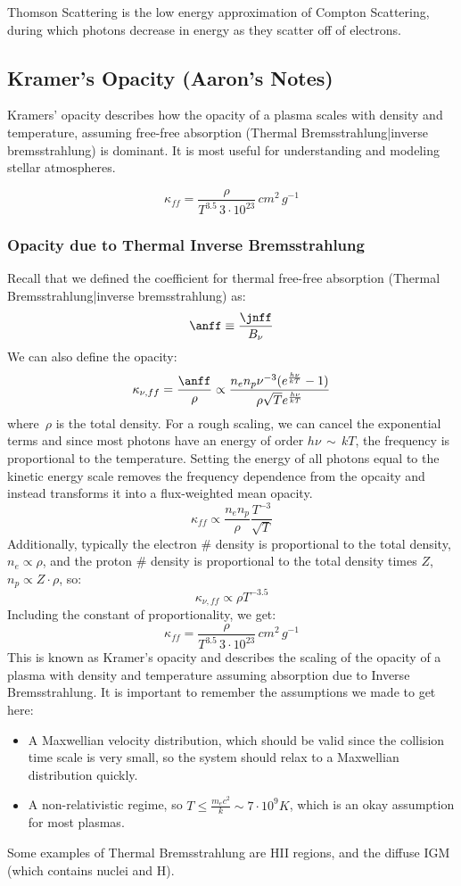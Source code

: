 \documentclass{article}
\begin{document}
Thomson Scattering is the low energy approximation of Compton Scattering, during which photons decrease in energy as they scatter off of electrons.


\subsection{Kramer's Opacity (Aaron's Notes)}

Kramers' opacity describes how the opacity of a plasma scales with density and temperature, assuming free-free absorption (Thermal Bremsstrahlung|inverse bremsstrahlung) is dominant. It is most useful for understanding and modeling stellar atmospheres.

$$\kappa_{ff} =\frac{\rho }{ T^{3.5}\,3\cdot10^{23}}\,cm^2\, g^{-1}$$

\subsubsection{Opacity due to Thermal Inverse Bremsstrahlung}

Recall that we defined the coefficient for thermal free-free absorption (Thermal Bremsstrahlung|inverse bremsstrahlung) as:
\def\knff{\kappa_{\nu,ff}}
$$\anff\equiv\frac{\jnff}{ B_{\nu}}$$
We can also define the opacity:
$$\knff=\frac{\anff}{\rho}\propto\frac{n_en_p\nu^{-3}(e^\frac{h\nu}{ kT}-1)}{
\rho\sqrt{T}e^\frac{h\nu}{ kT}}$$
where $\,\rho$ is the total density.  For a rough scaling, we can cancel the exponential terms and since most photons have an energy of order $h\nu\,\sim\, kT$, the frequency is proportional to the temperature. Setting the energy of all photons equal to the kinetic energy scale removes the frequency dependence from the opcaity and instead transforms it into a flux-weighted mean opacity.
$$\kappa_{ff}\propto\frac{n_en_p}{\rho}\frac{T^{-3}}{\sqrt{T}}$$
Additionally, typically the electron \# density is proportional to the total density, $n_e\propto\rho$, and the proton \# density is proportional to the total density times $Z$, $n_p\propto Z\cdot\rho$, so:
$$\boxed{\knff\propto\rho T^{-3.5}}$$
Including the constant of proportionality, we get:
$$\kappa_{ff}=\frac{\rho }{ T^{3.5}\,3\cdot10^{23}}\,cm^2\, g^{-1}$$
This is known as Kramer's opacity and describes the scaling of the opacity of a plasma with density and temperature assuming absorption due to Inverse Bremsstrahlung.
It is important to remember the assumptions we made to get here:
\begin{itemize}
\item A Maxwellian velocity distribution, which should be valid since the
collision time scale is very small, so the system should relax to a 
Maxwellian distribution quickly.
\item A non-relativistic regime, so $T\le\frac{m_ec^2}{ k}\sim7\cdot 10^9K$, which
is an okay assumption for most plasmas.
\end{itemize}
Some examples of Thermal Bremsstrahlung are HII regions, and the diffuse
IGM (which contains nuclei and H).
\end{document}
